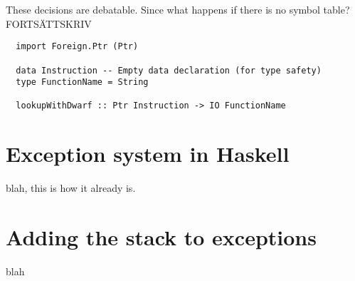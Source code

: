 These decisions are debatable. Since what happens if there is no symbol
table? FORTSÄTTSKRIV

\begin{verbatim}
  import Foreign.Ptr (Ptr)

  data Instruction -- Empty data declaration (for type safety)
  type FunctionName = String

  lookupWithDwarf :: Ptr Instruction -> IO FunctionName
\end{verbatim}

\section{Exception system in Haskell}

blah, this is how it already is.

\section{Adding the stack to exceptions}

blah
